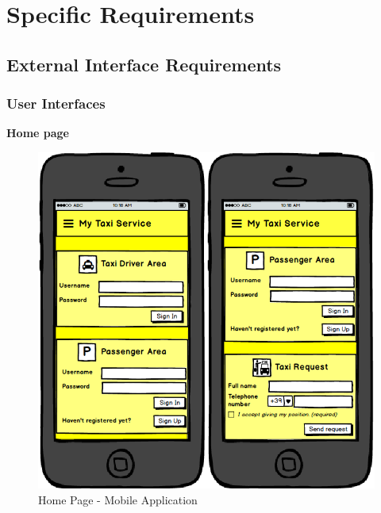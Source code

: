 \section{Specific Requirements}
	\subsection{External Interface Requirements}
		\subsubsection{User Interfaces}
		\begin{description}
			\item{\textbf{Home page}}
			\begin{figure}[!h]
				\centering					
				\includegraphics[scale=0.5]{../SE2_MOCKUPS/MobileAppHomePage.png}
				\caption{Home Page - Mobile Application}	
			\end{figure}
		\end{description}
		
		
		\newpage
